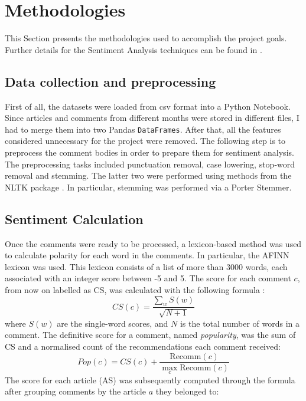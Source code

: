 \section{Methodologies}
\label{Metho}

This Section presents the methodologies used to accomplish the project goals. Further details for the Sentiment Analysis techniques can be found in \cite{Aggarwal}.

\subsection{Data collection and preprocessing}

First of all, the datasets were loaded from csv format into a Python Notebook. Since articles and comments from different months were stored in different files, I had to merge them into two Pandas {\tt DataFrames}. After that, all the features considered unnecessary for the project were removed. 
The following step is to preprocess the comment bodies in order to prepare them for sentiment analysis. The preprocessing tasks included punctuation removal, case lowering, stop-word removal and stemming. The latter two were performed using methods from the NLTK package \cite{NLTK}. In particular, stemming was performed via a Porter Stemmer.

\subsection{Sentiment Calculation}
Once the comments were ready to be processed, a lexicon-based method was used to calculate polarity for each word in the comments. In particular, the AFINN lexicon \cite{AFINN} was used. This lexicon consists of a list of more than 3000 words, each associated with an integer score between -5 and 5. The score for each comment $c$, from now on labelled as CS, was calculated with the following formula \cite{Guardian}:
\begin{equation}
CS(c) = \frac{\sum_{w} S(w)}{\sqrt{N+1}}
\end{equation}
where $S(w)$ are the single-word scores, and $N$ is the total number of words in a comment. The definitive score for a comment, named \textit{popularity}, was the sum of CS and a normalised count of the recommendations each comment received:
\begin{equation}
Pop (c) = CS(c) + \frac{\mbox{Recomm} (c)}{\max_c{\mbox{Recomm}(c)}}
\end{equation}
The score for each article (AS) was subsequently computed through the formula after grouping comments by the article $a$ they belonged to:

